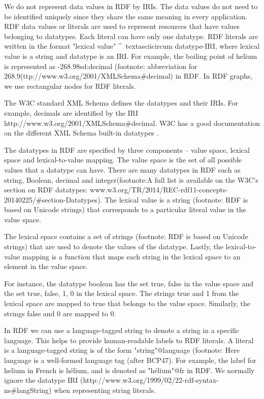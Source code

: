 We do not represent data values in RDF by IRIs. The data values do not need to be identified uniquely since they share the same meaning in every application. RDF data values or literals are used to represent resources that have values belonging to datatypes. Each literal can have only one datatype. RDF literals are written in the format "lexical value" \textasciicircum\ textasciicircum datatype-IRI, where lexical value is a string and datatype is an IRI. For example, the boiling point of helium is represented as -268.9^^xsd:decimal (footnote: abbreviation for 268.9^^http://www.w3.org/2001/XMLSchema\#decimal) in RDF. In RDF graphs, we use rectangular nodes for RDF literals.

The W3C standard XML Schema defines the datatypes and their IRIs. For example, decimals are identified by the IRI http://www.w3.org/2001/XMLSchema\#decimal. W3C has a good documentation on the different XML Schema built-in datatypes \cite{R.Cyganiak2014}. 

The datatypes in RDF are specified by three components – value space, lexical space and lexical-to-value mapping. The value space is the set of all possible values that a datatype can have. There are many datatypes in RDF such as string, Boolean, decimal and integer(footnote:A full list is available on the W3C’s section on RDF datatypes: www.w3.org/TR/2014/REC-rdf11-concepts-20140225/\#section-Datatypes). The lexical value is a string (footnote: RDF is based on Unicode strings) that corresponds to a particular literal value in the value space.

The lexical space contains a set of strings (footnote: RDF is based on Unicode strings) that are used to denote the values of the datatype. Lastly, the lexical-to-value mapping is a function that maps each string in the lexical space to an element in the value space. 

For instance, the datatype boolean has the set {true, false} in the value space and the set {true, false, 1, 0} in the lexical space. The strings true and 1 from the lexical space are mapped to true that belongs to the value space. Similarly, the strings false and 0 are mapped to 0. 

In RDF we can use a language-tagged string to denote a string in a specific language. This helps to provide human-readable labels to RDF literals. A literal is a language-tagged string is of the form "string"@language (footnote: Here language is a well-formed language tag (after BCP47). For example, the label for helium in French is hélium, and is denoted as "hélium"@fr in RDF. We normally ignore the datatype IRI (http://www.w3.org/1999/02/22-rdf-syntax-ns\#langString) when representing string literals. 


